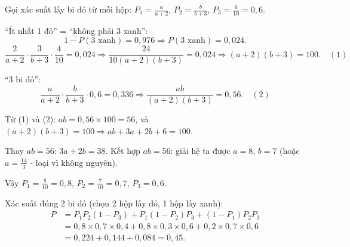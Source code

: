 \begin{loigiai}
Gọi xác suất lấy bi đỏ từ mỗi hộp: $P_1 = \frac{a}{a+2}$, $P_2 = \frac{b}{b+3}$, $P_3 = \frac{6}{10} = 0{,}6$.

``Ít nhất 1 đỏ'' = ``không phải 3 xanh'':
\[ 1 - P(\text{3 xanh}) = 0{,}976 \Rightarrow P(\text{3 xanh}) = 0{,}024. \]
\[ \frac{2}{a+2} \cdot \frac{3}{b+3} \cdot \frac{4}{10} = 0{,}024 \Rightarrow \frac{24}{10(a+2)(b+3)} = 0{,}024 \Rightarrow (a+2)(b+3) = 100. \quad (1) \]

``3 bi đỏ'':
\[ \frac{a}{a+2} \cdot \frac{b}{b+3} \cdot 0{,}6 = 0{,}336 \Rightarrow \frac{ab}{(a+2)(b+3)} = 0{,}56. \quad (2) \]

Từ (1) và (2): $ab = 0{,}56 \times 100 = 56$, và $(a+2)(b+3) = 100 \Rightarrow ab + 3a + 2b + 6 = 100$.

Thay $ab = 56$: $3a + 2b = 38$. Kết hợp $ab = 56$: giải hệ ta được $a = 8$, $b = 7$ (hoặc $a = \frac{14}{3}$ - loại vì không nguyên).

Vậy $P_1 = \frac{8}{10} = 0{,}8$, $P_2 = \frac{7}{10} = 0{,}7$, $P_3 = 0{,}6$.

Xác suất đúng 2 bi đỏ (chọn 2 hộp lấy đỏ, 1 hộp lấy xanh):
\begin{align*}
P &= P_1 P_2 (1-P_3) + P_1 (1-P_2) P_3 + (1-P_1) P_2 P_3 \\
  &= 0{,}8 \times 0{,}7 \times 0{,}4 + 0{,}8 \times 0{,}3 \times 0{,}6 + 0{,}2 \times 0{,}7 \times 0{,}6 \\
  &= 0{,}224 + 0{,}144 + 0{,}084 = \boxed{0{,}45}.
\end{align*}
\end{loigiai}

